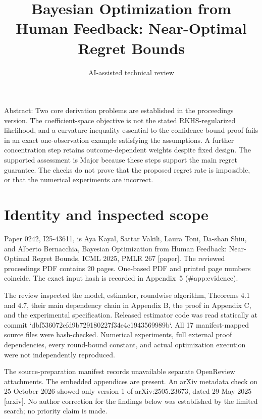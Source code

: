 \documentclass[10pt]{article}
\title{Bayesian Optimization from Human Feedback: Near-Optimal Regret Bounds}
\author{AI-assisted technical review}
\date{}
\begin{document}
\maketitle
Abstract: Two core derivation problems are established in the proceedings version. The coefficient-space objective is not the stated RKHS-regularized likelihood, and a curvature inequality essential to the confidence-bound proof fails in an exact one-observation example satisfying the assumptions. A further concentration step retains outcome-dependent weights despite fixed design. The supported assessment is Major because these steps support the main regret guarantee. The checks do not prove that the proposed regret rate is impossible, or that the numerical experiments are incorrect.\par
\section*{Identity and inspected scope}
Paper 0242, I25-43611, is Aya Kayal, Sattar Vakili, Laura Toni, Da-shan Shiu, and Alberto Bernacchia, Bayesian Optimization from Human Feedback: Near-Optimal Regret Bounds, ICML 2025, PMLR 267 [paper]. The reviewed proceedings PDF contains 20 pages. One-based PDF and printed page numbers coincide. The exact input hash is recorded in Appendix 5 (\#app:evidence).\par
The review inspected the model, estimator, roundwise algorithm, Theorems 4.1 and 4.7, their main dependency chain in Appendix B, the proof in Appendix C, and the experimental specification. Released estimator code was read statically at commit `dbf536072efd9b729180227f34e4c1943569989b`. All 17 manifest-mapped source files were hash-checked. Numerical experiments, full external proof dependencies, every round-bound constant, and actual optimization execution were not independently reproduced.\par
The source-preparation manifest records unavailable separate OpenReview attachments. The embedded appendices are present. An arXiv metadata check on 25 October 2026 showed only version 1 of arXiv:2505.23673, dated 29 May 2025 [arxiv]. No author correction for the findings below was established by the limited search; no priority claim is made.\par
\end{document}
